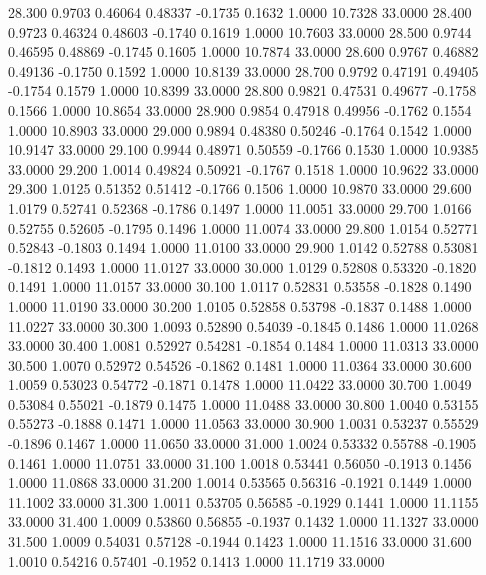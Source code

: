   28.300   0.9703   0.46064   0.48337  -0.1735   0.1632   1.0000  10.7328  33.0000
  28.400   0.9723   0.46324   0.48603  -0.1740   0.1619   1.0000  10.7603  33.0000
  28.500   0.9744   0.46595   0.48869  -0.1745   0.1605   1.0000  10.7874  33.0000
  28.600   0.9767   0.46882   0.49136  -0.1750   0.1592   1.0000  10.8139  33.0000
  28.700   0.9792   0.47191   0.49405  -0.1754   0.1579   1.0000  10.8399  33.0000
  28.800   0.9821   0.47531   0.49677  -0.1758   0.1566   1.0000  10.8654  33.0000
  28.900   0.9854   0.47918   0.49956  -0.1762   0.1554   1.0000  10.8903  33.0000
  29.000   0.9894   0.48380   0.50246  -0.1764   0.1542   1.0000  10.9147  33.0000
  29.100   0.9944   0.48971   0.50559  -0.1766   0.1530   1.0000  10.9385  33.0000
  29.200   1.0014   0.49824   0.50921  -0.1767   0.1518   1.0000  10.9622  33.0000
  29.300   1.0125   0.51352   0.51412  -0.1766   0.1506   1.0000  10.9870  33.0000
  29.600   1.0179   0.52741   0.52368  -0.1786   0.1497   1.0000  11.0051  33.0000
  29.700   1.0166   0.52755   0.52605  -0.1795   0.1496   1.0000  11.0074  33.0000
  29.800   1.0154   0.52771   0.52843  -0.1803   0.1494   1.0000  11.0100  33.0000
  29.900   1.0142   0.52788   0.53081  -0.1812   0.1493   1.0000  11.0127  33.0000
  30.000   1.0129   0.52808   0.53320  -0.1820   0.1491   1.0000  11.0157  33.0000
  30.100   1.0117   0.52831   0.53558  -0.1828   0.1490   1.0000  11.0190  33.0000
  30.200   1.0105   0.52858   0.53798  -0.1837   0.1488   1.0000  11.0227  33.0000
  30.300   1.0093   0.52890   0.54039  -0.1845   0.1486   1.0000  11.0268  33.0000
  30.400   1.0081   0.52927   0.54281  -0.1854   0.1484   1.0000  11.0313  33.0000
  30.500   1.0070   0.52972   0.54526  -0.1862   0.1481   1.0000  11.0364  33.0000
  30.600   1.0059   0.53023   0.54772  -0.1871   0.1478   1.0000  11.0422  33.0000
  30.700   1.0049   0.53084   0.55021  -0.1879   0.1475   1.0000  11.0488  33.0000
  30.800   1.0040   0.53155   0.55273  -0.1888   0.1471   1.0000  11.0563  33.0000
  30.900   1.0031   0.53237   0.55529  -0.1896   0.1467   1.0000  11.0650  33.0000
  31.000   1.0024   0.53332   0.55788  -0.1905   0.1461   1.0000  11.0751  33.0000
  31.100   1.0018   0.53441   0.56050  -0.1913   0.1456   1.0000  11.0868  33.0000
  31.200   1.0014   0.53565   0.56316  -0.1921   0.1449   1.0000  11.1002  33.0000
  31.300   1.0011   0.53705   0.56585  -0.1929   0.1441   1.0000  11.1155  33.0000
  31.400   1.0009   0.53860   0.56855  -0.1937   0.1432   1.0000  11.1327  33.0000
  31.500   1.0009   0.54031   0.57128  -0.1944   0.1423   1.0000  11.1516  33.0000
  31.600   1.0010   0.54216   0.57401  -0.1952   0.1413   1.0000  11.1719  33.0000
